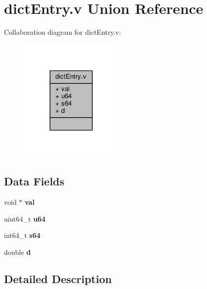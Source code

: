 \hypertarget{uniondictEntry_8v}{}\section{dict\+Entry.\+v Union Reference}
\label{uniondictEntry_8v}


Collaboration diagram for dict\+Entry.\+v\+:\nopagebreak
\begin{figure}[H]
\begin{center}
\leavevmode
\includegraphics[width=144pt]{uniondictEntry_8v__coll__graph}
\end{center}
\end{figure}
\subsection*{Data Fields}
\begin{DoxyCompactItemize}
\item 
\mbox{\label{uniondictEntry_8v_a3a6d0284e743dc4a9b86f97d6dd1a3bf}} 
void $\ast$ {\bfseries val}
\item 
\mbox{\label{uniondictEntry_8v_a476bf781fb66b23778b1004edc3a1028}} 
uint64\+\_\+t {\bfseries u64}
\item 
\mbox{\label{uniondictEntry_8v_a1919b6c3d1a9b2545d55cd7176afd38b}} 
int64\+\_\+t {\bfseries s64}
\item 
\mbox{\label{uniondictEntry_8v_a8277e0910d750195b448797616e091ad}} 
double {\bfseries d}
\end{DoxyCompactItemize}


\subsection{Detailed Description}


